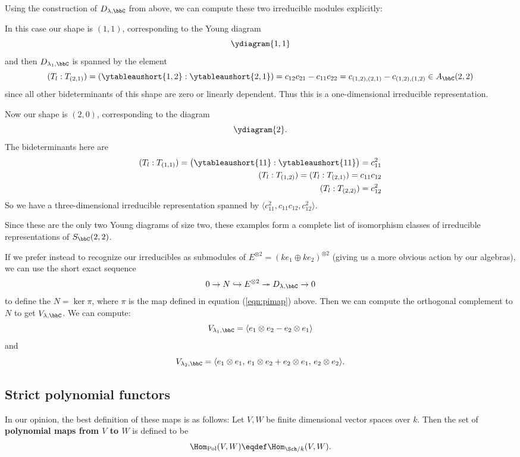 \documentclass[12pt]{article}
\begin{document}
		Using the construction of $D_{\lambda,\bbC}$ from above, we can compute these two irreducible modules explicitly:

		\begin{ex}[$\mathbf{\lambda_1=(1,1)}$]
		In this case our shape is $(1,1)$, corresponding to the Young diagram 
		\[\ydiagram{1,1}\]
		and then $D_{\lambda_1,\bbC}$ is spanned by the element
		\[(T_l:T_{(2,1)})=\left(\ytableaushort{1,2}:\ytableaushort{2,1}\right)=c_{12}c_{21}-c_{11}c_{22}=c_{(1,2),(2,1)}-c_{(1,2),(1,2)}\in A_\bbC(2,2)\]
		since all other bideterminants of this shape are zero or linearly dependent. Thus this is a one-dimensional irreducible representation.
		\end{ex}
		\begin{ex}[$\mathbf{\lambda_2=(2,0)}$]
		Now our shape is $(2,0)$, corresponding to the diagram
		\[\ydiagram{2}.\]
		The bideterminants here are 
		\begin{align*}
			(T_l:T_{(1,1)})=\big(\ytableaushort{1 1}:\ytableaushort{1 1}\big)=c_{11}^2\\
			(T_l:T_{(1,2)})=(T_l:T_{(2,1)})=c_{11}c_{12}\\
			(T_l:T_{(2,2)})=c_{12}^2
		\end{align*}
		So we have a three-dimensional irreducible representation spanned by $\langle c_{11}^2,c_{11}c_{12},c_{12}^2\rangle$.
		\end{ex}
		Since these are the only two Young diagrams of size two, these examples form a complete list of isomorphism classes of irreducible representations of $S_\bbC(2,2)$.

		If we prefer instead to recognize our irreducibles as submodules of $E^{\otimes 2}=(k e_1\oplus k e_2)^{\otimes 2}$ (giving us a more obvious action by our algebras), 
		we can use the short exact sequence 
		\[0\to N\hookrightarrow E^{\otimes 2}\twoheadrightarrow D_{\lambda,\bbC}\to 0\]
		to define the $N=\ker\pi$, where $\pi$ is the map defined in equation (\ref{eqn:pimap}) above.
		Then we can compute the orthogonal complement to $N$ to get $V_{\lambda,\bbC}$.
		We can compute:
		\[V_{\lambda_1,\bbC}=\langle e_1\otimes e_2-e_2\otimes e_1\rangle\]
		and
		\[V_{\lambda_2,\bbC}=\langle e_1\otimes e_1, \,e_1\otimes e_2+e_2\otimes e_1, \,e_2\otimes e_2\rangle.\]


	\subsection{Strict polynomial functors}
	\begin{rmk}
		In our opinion, the best definition of these maps is as follows:
		Let $V,W$ be finite dimensional vector spaces over $k$. Then the set of \textbf{polynomial maps from $V$ to $W$} is defined to be 
		\[\Hom_\text{Pol}(V,W)\eqdef \Hom_{\Sch/k}(V,W).\]
	\end{rmk}
	
\end{document}
